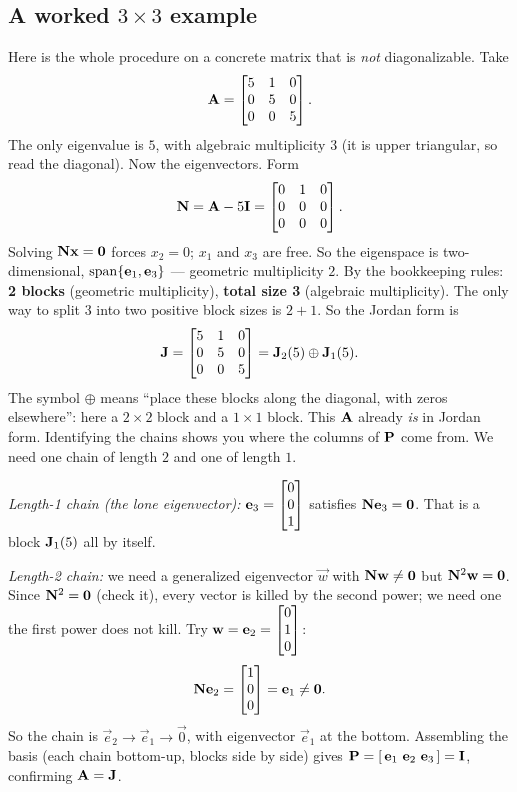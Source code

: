 \subsection{A worked $3\times 3$ example}

Here is the whole procedure on a concrete matrix that is \emph{not} diagonalizable. Take
\[
\mathbf{A}=\begin{bmatrix}5&1&0\\0&5&0\\0&0&5\end{bmatrix}.
\]
The only eigenvalue is $5$, with algebraic multiplicity $3$ (it is upper triangular, so
read the diagonal). Now the eigenvectors. Form
\[
\mathbf{N}=\mathbf{A}-5\mathbf{I}=\begin{bmatrix}0&1&0\\0&0&0\\0&0&0\end{bmatrix}.
\]
Solving $\mathbf{N}\mathbf{x}=\mathbf{0}$ forces $x_2=0$; $x_1$ and $x_3$ are free. So the
eigenspace is two-dimensional, $\operatorname{span}\{\mathbf{e}_1,\mathbf{e}_3\}$ --- geometric multiplicity
$2$. By the bookkeeping rules: \textbf{2 blocks} (geometric multiplicity), \textbf{total
size 3} (algebraic multiplicity). The only way to split $3$ into two positive block
sizes is $2+1$. So the Jordan form is
\[
\mathbf{J}=\begin{bmatrix}5&1&0\\0&5&0\\0&0&5\end{bmatrix}
=\mathbf{J}_2(5)\oplus\mathbf{J}_1(5).
\]
The symbol $\oplus$ means ``place these blocks along the diagonal, with zeros
elsewhere'': here a $2\times2$ block and a $1\times1$ block. This $\mathbf{A}$ already
\emph{is} in Jordan form. Identifying the chains shows you
where the columns of $\mathbf{P}$ come from. We need one chain of length $2$ and one of
length $1$.

\emph{Length-1 chain (the lone eigenvector):} $\mathbf{e}_3=\begin{bmatrix}0\\0\\1\end{bmatrix}$ satisfies
$\mathbf{N}\mathbf{e}_3=\mathbf{0}$. That is a block $\mathbf{J}_1(5)$ all by itself.

\emph{Length-2 chain:} we need a generalized eigenvector $\vec{w}$ with
$\mathbf{N}\mathbf{w}\neq\mathbf{0}$ but $\mathbf{N}^2\mathbf{w}=\mathbf{0}$. Since $\mathbf{N}^2=\mathbf{0}$
(check it), every vector is killed by the second power; we need one the first power does
not kill. Try $\mathbf{w}=\mathbf{e}_2=\begin{bmatrix}0\\1\\0\end{bmatrix}$:
\[
\mathbf{N}\mathbf{e}_2=\begin{bmatrix}1\\0\\0\end{bmatrix}=\mathbf{e}_1\neq\mathbf{0}.
\]
So the chain is $\vec{e}_2\to\vec{e}_1\to\vec{0}$, with eigenvector $\vec{e}_1$ at the
bottom. Assembling the basis (each chain bottom-up, blocks side by side) gives
$\mat{P}=[\,\vec{e}_1\ \vec{e}_2\ \vec{e}_3\,]=\mat{I}$, confirming $\mathbf{A}=\mathbf{J}$.

